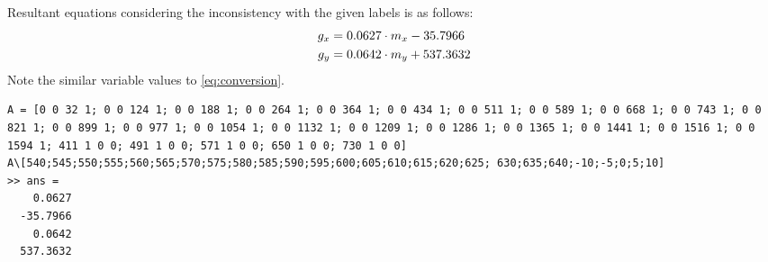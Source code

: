 \documentclass[a4paper]{article}
\begin{document}
Resultant equations considering the inconsistency with the given labels is as follows:
\begin{equation}{\label{eq:conversionbetter}}
	\begin{aligned}
		g_x &=  0.0627 \cdot m_x - 35.7966\\
		g_y &=  0.0642 \cdot m_y + 537.3632
	\end{aligned}
\end{equation}
Note the similar variable values to \ref{eq:conversion}.
\begin{verbatim}
A = [0 0 32 1; 0 0 124 1; 0 0 188 1; 0 0 264 1; 0 0 364 1; 0 0 434 1; 0 0 511 1; 0 0 589 1; 0 0 668 1; 0 0 743 1; 0 0 821 1; 0 0 899 1; 0 0 977 1; 0 0 1054 1; 0 0 1132 1; 0 0 1209 1; 0 0 1286 1; 0 0 1365 1; 0 0 1441 1; 0 0 1516 1; 0 0 1594 1; 411 1 0 0; 491 1 0 0; 571 1 0 0; 650 1 0 0; 730 1 0 0]
A\[540;545;550;555;560;565;570;575;580;585;590;595;600;605;610;615;620;625; 630;635;640;-10;-5;0;5;10]
>> ans =
    0.0627
  -35.7966
    0.0642
  537.3632
\end{verbatim}
\end{document}
